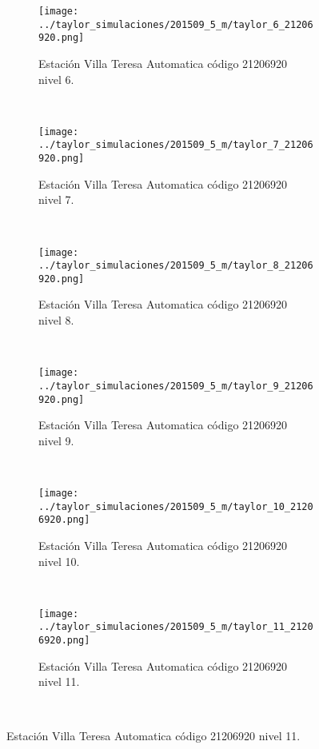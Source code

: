 \begin{figure}[H]\ContinuedFloat
\centering
\begin{subfigure}[normla]{0.4\textwidth}
\caption{Estación Villa Teresa Automatica  código 21206920 nivel 6.}
\texttt{[image: ../taylor\_simulaciones/201509\_5\_m/taylor\_6\_21206920.png]}
\end{subfigure}
~
\begin{subfigure}[normla]{0.4\textwidth}
\caption{Estación Villa Teresa Automatica  código 21206920 nivel 7.}
\texttt{[image: ../taylor\_simulaciones/201509\_5\_m/taylor\_7\_21206920.png]}
\end{subfigure}
~
\begin{subfigure}[normla]{0.4\textwidth}
\caption{Estación Villa Teresa Automatica  código 21206920 nivel 8.}
\texttt{[image: ../taylor\_simulaciones/201509\_5\_m/taylor\_8\_21206920.png]}
\end{subfigure}
~
\begin{subfigure}[normla]{0.4\textwidth}
\caption{Estación Villa Teresa Automatica  código 21206920 nivel 9.}
\texttt{[image: ../taylor\_simulaciones/201509\_5\_m/taylor\_9\_21206920.png]}
\end{subfigure}
~
\begin{subfigure}[normla]{0.4\textwidth}
\caption{Estación Villa Teresa Automatica  código 21206920 nivel 10.}
\texttt{[image: ../taylor\_simulaciones/201509\_5\_m/taylor\_10\_21206920.png]}
\end{subfigure}
~
\begin{subfigure}[normla]{0.4\textwidth}
\caption{Estación Villa Teresa Automatica  código 21206920 nivel 11.}
\texttt{[image: ../taylor\_simulaciones/201509\_5\_m/taylor\_11\_21206920.png]}
\end{subfigure}
~
\end{figure}
           
